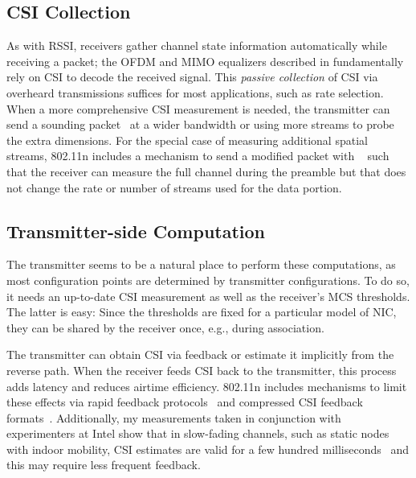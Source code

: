 \subsection{CSI Collection}
\label{sec:csi_collection}
As with RSSI, receivers gather channel state information automatically while receiving a packet; the OFDM and MIMO equalizers described in  fundamentally rely on CSI to decode the received signal. This \emph{passive collection} of CSI via overheard transmissions suffices for most applications, such as rate selection. When a more comprehensive CSI measurement is needed, the transmitter can send a sounding packet~\cite[\S20.3.13.1]{80211n} at a wider bandwidth or using more streams to probe the extra dimensions. For the special case of measuring additional spatial streams, 802.11n includes a mechanism to send a modified packet with ~\cite[\S20.3.9.4.6]{80211n} such that the receiver can measure the full channel during the preamble but that does not change the rate or number of streams used for the data portion.

\subsection{Transmitter-side Computation}
The transmitter seems to be a natural place to perform these computations, as most configuration points are determined by transmitter configurations. To do so, it needs an up-to-date CSI measurement as well as the receiver's MCS thresholds. The latter is easy: Since the thresholds are fixed for a particular model of NIC, they can be shared by the receiver once, e.g., during association.

The transmitter can obtain CSI via feedback or estimate it implicitly from the reverse path. When the receiver feeds CSI back to the transmitter, this process adds latency and reduces airtime efficiency. 802.11n includes mechanisms to limit these effects via rapid feedback protocols~\cite[\S9.19.2]{80211n} and compressed CSI feedback formats~\cite[\S20.3.12.2.5]{80211n}. Additionally, my measurements taken in conjunction with experimenters at Intel show that in slow-fading channels, such as static nodes with indoor mobility, CSI estimates are valid for a few hundred milliseconds~\cite{Perahia_Doppler} and this may require less frequent feedback.

